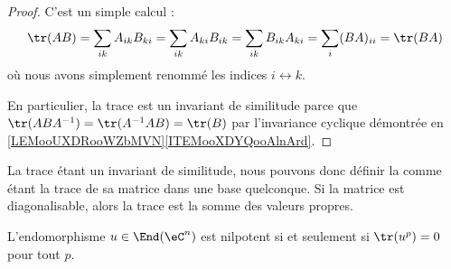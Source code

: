 \begin{proof}
    C'est un simple calcul :
    \begin{equation}
            \tr(AB)=\sum_{ik}A_{ik}B_{ki}
            =\sum_{ik}A_{ki}B_{ik}
            =\sum_{ik}B_{ik}A_{ki}
            =\sum_i(BA)_{ii}
            =\tr(BA)
    \end{equation}
    où nous avons simplement renommé les indices \( i\leftrightarrow k\).

    En particulier, la trace est un invariant de similitude parce que \( \tr(ABA^{-1})=\tr(A^{-1} AB)=\tr(B)\) par l'invariance cyclique démontrée en \ref{LEMooUXDRooWZbMVN}\ref{ITEMooXDYQooAlnArd}.
\end{proof}
La trace étant un invariant de similitude, nous pouvons donc définir la  comme étant la trace de sa matrice dans une base quelconque. Si la matrice est diagonalisable, alors la trace est la somme des valeurs propres.

\begin{lemma}   \label{LemzgNOjY}
    L'endomorphisme \( u\in\End(\eC^n)\) est nilpotent si et seulement si \( \tr(u^p)=0\) pour tout \( p\).
\end{lemma}

